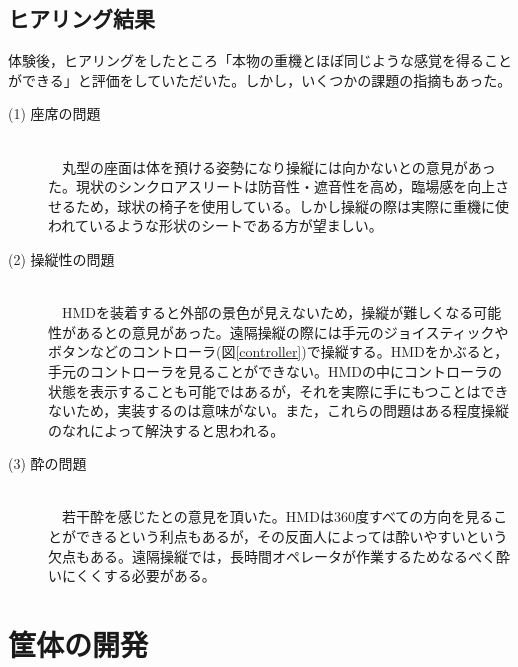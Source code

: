 \documentclass[a4paper,12pt]{jsarticle}
\newcommand{\figuref}[1]{図\ref{#1}}
\begin{document}
\clearpage
\subsection{ヒアリング結果}
体験後，ヒアリングをしたところ「本物の重機とほぼ同じような感覚を得ることができる」と評価をしていただいた。しかし，いくつかの課題の指摘もあった。

\begin{description}
  \item[(1) 座席の問題]\mbox{}\\　丸型の座面は体を預ける姿勢になり操縦には向かないとの意見があった。現状のシンクロアスリートは防音性・遮音性を高め，臨場感を向上させるため，球状の椅子を使用している。しかし操縦の際は実際に重機に使われているような形状のシートである方が望ましい。
  \item[(2) 操縦性の問題]\mbox{}\\　HMDを装着すると外部の景色が見えないため，操縦が難しくなる可能性があるとの意見があった。遠隔操縦の際には手元のジョイスティックやボタンなどのコントローラ(\figuref{controller})で操縦する。HMDをかぶると，手元のコントローラを見ることができない。HMDの中にコントローラの状態を表示することも可能ではあるが，それを実際に手にもつことはできないため，実装するのは意味がない。また，これらの問題はある程度操縦のなれによって解決すると思われる。
  \item[(3) 酔の問題]\mbox{}\\　若干酔を感じたとの意見を頂いた。HMDは360度すべての方向を見ることができるという利点もあるが，その反面人によっては酔いやすいという欠点もある。遠隔操縦では，長時間オペレータが作業するためなるべく酔いにくくする必要がある。
\end{description}

\clearpage

\section{筐体の開発}
\end{document}
